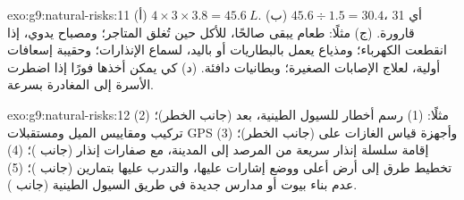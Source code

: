 \begin{solution}{exo:g9:natural-risks:11}
(أ) $4 \times 3 \times 3.8 = \qty{45.6}{L}$. (ب) $45.6 \div 1.5 = 30.4$،
أي 31 قارورة. (ج) مثلًا: طعام يبقى صالحًا، للأكل حين تُغلق المتاجر؛ ومصباح يدوي،
إذا انقطعت الكهرباء؛ ومذياع يعمل بالبطاريات أو باليد، لسماع الإنذارات؛ وحقيبة
إسعافات أولية، لعلاج الإصابات الصغيرة؛ وبطانيات دافئة. (د) كي يمكن أخذها فورًا إذا
اضطرت الأسرة إلى المغادرة بسرعة.
\end{solution}

\begin{solution}{exo:g9:natural-risks:12}
مثلًا: (1) رسم  أخطار للسيول الطينية،  بعد  (جانب الخطر)؛ (2) تركيب
 ومقاييس الميل ومستقبلات GPS وأجهزة قياس الغازات على  (جانب
الخطر)؛ (3) إقامة سلسلة إنذار سريعة من المرصد إلى المدينة، مع صفارات إنذار (جانب
)؛ (4) تخطيط طرق إلى أرض أعلى ووضع إشارات عليها، والتدرب عليها بتمارين
(جانب )؛ (5) عدم بناء بيوت أو مدارس جديدة في طريق السيول الطينية (جانب
).
\end{solution}

